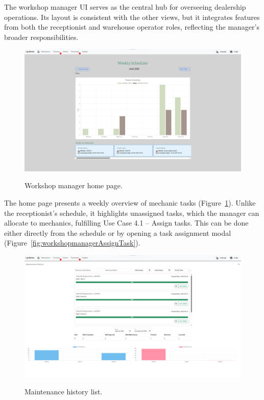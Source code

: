The workshop manager \ac{UI} serves as the central hub for overseeing dealership operations. Its layout is consistent with the other views, but it integrates features from both the receptionist and warehouse operator roles, reflecting the manager's broader responsibilities.


\begin{figure}[h]
  \caption{Workshop manager home page.}
  \centering
  \includegraphics[width=\textwidth]{figs/Implementation/workshopmanager/homePage}
  \label{fig:workshopmanagerHomePage}
\end{figure}



The home page presents a weekly overview of mechanic tasks (Figure~\ref{fig:workshopmanagerHomePage}). Unlike the receptionist's schedule, it highlights unassigned tasks, which the manager can allocate to mechanics, fulfilling Use Case 4.1 – Assign tasks. This can be done either directly from the schedule or by opening a task assignment modal (Figure~\ref{fig:workshopmanagerAssignTask}).






\begin{figure}[h]
  \caption{Maintenance history list.}
  \centering
  \includegraphics[width=\textwidth]{figs/Implementation/workshopmanager/maintenanceHistory}
  \label{fig:maintenanceHistory}
\end{figure}



